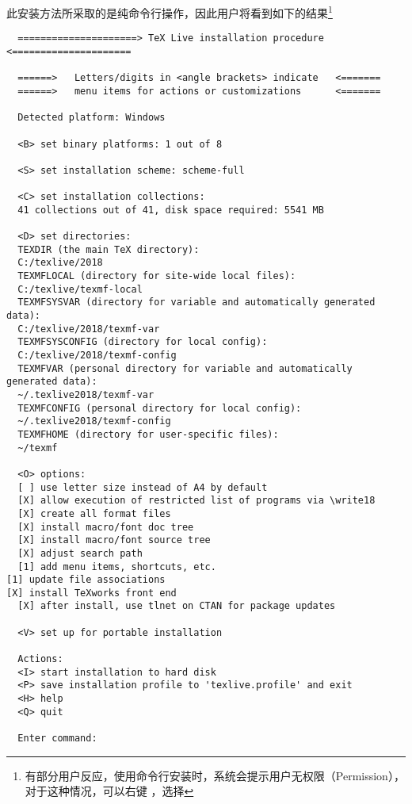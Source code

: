 \documentclass{ctexart}
\begin{document}
此安装方法所采取的是纯命令行操作，因此用户将看到如下的结果\footnote{有部分用户反应，使用命令行安装时，系统会提示用户无权限（Permission），对于这种情况，可以右键 ，选择 }
\begin{lstlisting}
  =====================> TeX Live installation procedure <=====================
  
  ======>   Letters/digits in <angle brackets> indicate   <=======
  ======>   menu items for actions or customizations      <=======
  
  Detected platform: Windows
  
  <B> set binary platforms: 1 out of 8
  
  <S> set installation scheme: scheme-full
  
  <C> set installation collections:
  41 collections out of 41, disk space required: 5541 MB
  
  <D> set directories:
  TEXDIR (the main TeX directory):
  C:/texlive/2018
  TEXMFLOCAL (directory for site-wide local files):
  C:/texlive/texmf-local
  TEXMFSYSVAR (directory for variable and automatically generated data):
  C:/texlive/2018/texmf-var
  TEXMFSYSCONFIG (directory for local config):
  C:/texlive/2018/texmf-config
  TEXMFVAR (personal directory for variable and automatically generated data):
  ~/.texlive2018/texmf-var
  TEXMFCONFIG (personal directory for local config):
  ~/.texlive2018/texmf-config
  TEXMFHOME (directory for user-specific files):
  ~/texmf
  
  <O> options:
  [ ] use letter size instead of A4 by default
  [X] allow execution of restricted list of programs via \write18
  [X] create all format files
  [X] install macro/font doc tree
  [X] install macro/font source tree
  [X] adjust search path
  [1] add menu items, shortcuts, etc.                                                                                                                                                                                                          [1] update file associations                                                                                                                                                                                                                 [X] install TeXworks front end
  [X] after install, use tlnet on CTAN for package updates
  
  <V> set up for portable installation
  
  Actions:
  <I> start installation to hard disk
  <P> save installation profile to 'texlive.profile' and exit
  <H> help
  <Q> quit
  
  Enter command:
\end{lstlisting}
\end{document}
